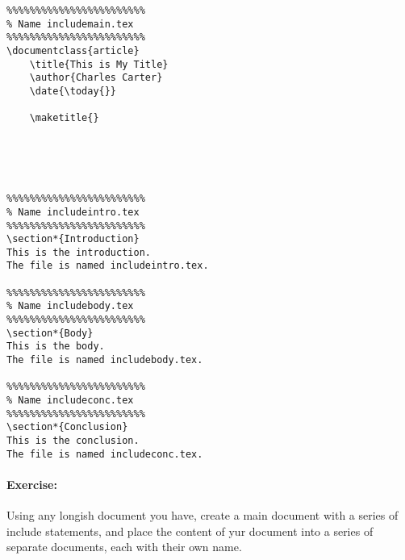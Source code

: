         \begin{verbatim}
%%%%%%%%%%%%%%%%%%%%%%%%
% Name includemain.tex        
%%%%%%%%%%%%%%%%%%%%%%%%
\documentclass{article}
    \title{This is My Title}
    \author{Charles Carter}
    \date{\today{}}
 
    \maketitle{}
    
    
    
    

%%%%%%%%%%%%%%%%%%%%%%%%
% Name includeintro.tex        
%%%%%%%%%%%%%%%%%%%%%%%%
\section*{Introduction}
This is the introduction.
The file is named includeintro.tex.

%%%%%%%%%%%%%%%%%%%%%%%%
% Name includebody.tex        
%%%%%%%%%%%%%%%%%%%%%%%%
\section*{Body}
This is the body.
The file is named includebody.tex.

%%%%%%%%%%%%%%%%%%%%%%%%
% Name includeconc.tex        
%%%%%%%%%%%%%%%%%%%%%%%%
\section*{Conclusion}
This is the conclusion.
The file is named includeconc.tex.
        \end{verbatim}

        \begin{sample}
    
    
    
        \end{sample}


        \paragraph{Exercise:} Using any longish document you have, create a main document with a series of include statements, and place the content of yur document into a series of separate documents, each with their own name.

